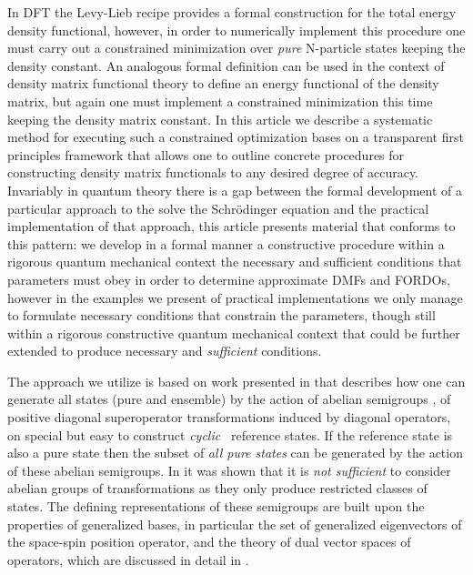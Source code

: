 \documentclass[aps,preprint]{revtex4}%
\begin{document}
In DFT the Levy-Lieb \cite{LevyLieb} recipe provides a formal construction for
the total energy density functional, however, in order to numerically
implement this procedure one must carry out a constrained minimization over
\emph{pure }N-particle states keeping the density constant. An analogous
formal definition can be used in the context of density matrix functional
theory to define an energy functional of the density matrix, but again one
must implement a constrained minimization this time keeping the density matrix
constant. In this article we describe a systematic method for executing such a
constrained optimization bases on a transparent first principles framework
that allows one to outline concrete procedures for constructing density matrix
functionals to any desired degree of accuracy. Invariably in quantum theory
there is a gap between the formal development of a particular approach to the
solve the Schr\"{o}dinger equation and the practical implementation of that
approach, this article presents material that conforms to this pattern: we
develop in a formal manner a constructive procedure within a rigorous quantum
mechanical context the necessary and sufficient conditions that parameters
must obey in order to determine approximate DMFs and FORDOs, however in the
examples we present of practical implementations we only manage to formulate
necessary conditions that constrain the parameters, though still within a
rigorous constructive quantum mechanical context that could be further
extended to produce necessary and \emph{sufficient }conditions.

The approach we utilize is based on work presented in \cite{weiner 2002} that
describes how one can generate all states (pure and ensemble) by the action of
abelian semigroups \cite{semigroups}, of positive diagonal superoperator
transformations induced by diagonal operators, on special but easy to
construct \emph{cyclic} \cite{weiner2002}\emph{\ }reference states. If the
reference state is also a pure state then the subset of \emph{all pure states}
can be generated by the action of these abelian semigroups. In
\cite{weiner2002} it was shown that it is \emph{not sufficient }to consider
abelian groups of transformations as they only produce restricted classes of
states. The defining representations of these semigroups are built upon the
properties of generalized bases, in particular the set of generalized
eigenvectors of the space-spin position operator, and the theory of dual
vector spaces of operators, which are discussed in detail in \cite{weiner2002}.
\end{document}
